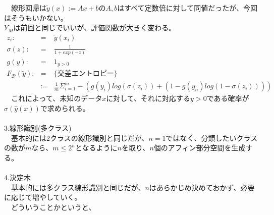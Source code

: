 \documentclass{jsarticle}
\begin{document}
 　線形回帰は$\tilde{y}(x):=Ax+b$の$A,b$はすべて定数倍に対して同値だったが、今回はそうもいかない。\\
  $Y_M$は前回と同じでいいが、評価関数が大きく変わる。
\begin{eqnarray}
z_i:&=&\tilde{y}(x_i)\nonumber\\
\sigma(z):&=&\frac{1}{1+exp(-z)}\nonumber\\
g(y):&=&1_{y>0}\nonumber\\
F_\mathcal{D}(\tilde{y}):&=&\{交差エントロピー\}\nonumber\\
&:=&\frac{1}{m}\Sigma_{i=1}^m -(g(y_i)log(\sigma(z_i))+(1-g(y_n)log(1-\sigma(z_i))))
\end{eqnarray}
　これによって、未知のデータ$x$に対して、それに対応する$y>0$である確率が$\sigma(\hat{y}(x))$で求められる。\\
　\\
3.線形識別(多クラス)\\
　基本的には2クラスの線形識別と同じだが、$n=1$ではなく、分類したいクラスの数が$m$なら、$m\leq2^n$となるように$n$を取り、$n$個のアフィン部分空間を生成する。\\
　\\
4.決定木\\
　基本的には多クラス線形識別と同じだが、$n$はあらかじめ決めておかず、必要に応じて増やしていく。\\
　どういうことかというと、
\end{document}
